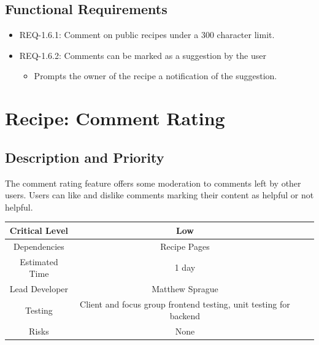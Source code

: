 \documentclass{scrreprt}
\begin{document}
\subsection{Functional Requirements}

\begin{itemize}
    \item REQ-1.6.1: Comment on public recipes under a 300 character limit.
    \item REQ-1.6.2: Comments can be marked as a suggestion by the user
          \begin{itemize}
              \item Prompts the owner of the recipe a notification of the suggestion.
          \end{itemize}
\end{itemize}

\section{Recipe: Comment Rating}

\subsection{Description and Priority}

The comment rating feature offers some moderation to comments left by other users. Users can like and dislike comments marking their content as helpful or not helpful.

\begin{center}
    \begin{tabular}{| c | c | c | c |}
        \hline
        Critical Level & Low                                                               \\
        \hline
        Dependencies   & Recipe Pages                                                      \\
        \hline
        Estimated Time & 1 day                                                             \\
        \hline
        Lead Developer & Matthew Sprague                                                   \\
        \hline
        Testing        & Client and focus group frontend testing, unit testing for backend \\
        \hline
        Risks          & None                                                              \\
        \hline
    \end{tabular}
\end{center}
\end{document}
